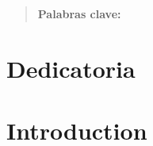 \documentclass[12pt]{report} %
\begin{document}
\newpage %
\thispagestyle{empty}
\mbox{}

\renewcommand\abstractname{\large\bfseries\filcenter\uppercase{Resumen}}
\begin{abstract}
\thispagestyle{plain}
\setcounter{page}{3}
	
	
	\textbf{Palabras clave:}
	
	\vfill
\end{abstract}
	\newpage %
	\thispagestyle{empty}
	\mbox{}


\chapter*{Dedicatoria} %

\setcounter{page}{5}
	
		
	\vfill
	
	\newpage %
	\thispagestyle{empty}
	\mbox{}
	


\tableofcontents
\thispagestyle{fancy}

\newpage %
\thispagestyle{empty}

\listoffigures
\thispagestyle{fancy}

\newpage %
\thispagestyle{empty}
\mbox{}

\listoftables
\thispagestyle{fancy}

\newpage %
\thispagestyle{empty}
\mbox{}


\clearpage
{} %

\chapter{Introduction}
\end{document}
